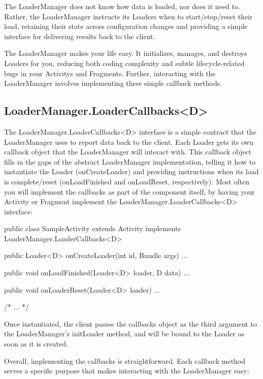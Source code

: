 The LoaderManager does not know how data is loaded, nor does it need to. Rather, the LoaderManager instructs its Loaders when to start/stop/reset their load, retaining their state across configuration changes and providing a simple interface for delivering results back to the client. 

The LoaderManager makes your life easy. It initializes, manages, and destroys Loaders for you, reducing both coding complexity and subtle lifecycle-related bugs in your Activitys and Fragments. Further, interacting with the LoaderManager involves implementing three simple callback methods.

\subsection{LoaderManager.LoaderCallbacks<D>}
The LoaderManager.LoaderCallbacks<D> interface is a simple contract that the LoaderManager uses to report data back to the client. Each Loader gets its own callback object that the LoaderManager will interact with. This callback object fills in the gaps of the abstract LoaderManager implementation, telling it how to instantiate the Loader (onCreateLoader) and providing instructions when its load is complete/reset (onLoadFinished and onLoadReset, respectively). Most often you will implement the callbacks as part of the component itself, by having your Activity or Fragment implement the LoaderManager.LoaderCallbacks<D> interface:

\begin{android}
public class SampleActivity extends Activity implements LoaderManager.LoaderCallbacks<D> {
	
	public Loader<D> onCreateLoader(int id, Bundle args) { ... }
	
	public void onLoadFinished(Loader<D> loader, D data) { ... }
	
	public void onLoaderReset(Loader<D> loader) { ... }
	
	/* ... */
}	
\end{android}

Once instantiated, the client passes the callbacks object  as the third argument to the LoaderManager’s initLoader method, and will be bound to the Loader as soon as it is created.

Overall, implementing the callbacks is straightforward. Each callback method serves a specific purpose that makes interacting with the LoaderManager easy:

